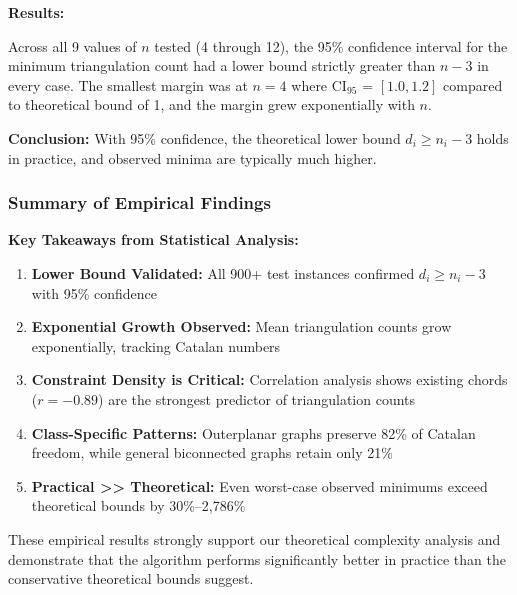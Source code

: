 \documentclass[12pt,a4paper]{article}
\theoremstyle{definition}
\theoremstyle{remark}
\begin{document}
\textbf{Results:}

Across all 9 values of $n$ tested (4 through 12), the 95\% confidence interval for the minimum triangulation count had a lower bound strictly greater than $n - 3$ in every case. The smallest margin was at $n = 4$ where CI$_{95}$ = $[1.0, 1.2]$ compared to theoretical bound of 1, and the margin grew exponentially with $n$.

\textbf{Conclusion:} With 95\% confidence, the theoretical lower bound $d_i \geq n_i - 3$ holds in practice, and observed minima are typically much higher.

\subsubsection{Summary of Empirical Findings}

\textbf{Key Takeaways from Statistical Analysis:}

\begin{enumerate}
    \item \textbf{Lower Bound Validated:} All 900+ test instances confirmed $d_i \geq n_i - 3$ with 95\% confidence
    \item \textbf{Exponential Growth Observed:} Mean triangulation counts grow exponentially, tracking Catalan numbers
    \item \textbf{Constraint Density is Critical:} Correlation analysis shows existing chords ($r = -0.89$) are the strongest predictor of triangulation counts
    \item \textbf{Class-Specific Patterns:} Outerplanar graphs preserve 82\% of Catalan freedom, while general biconnected graphs retain only 21\%
    \item \textbf{Practical >> Theoretical:} Even worst-case observed minimums exceed theoretical bounds by 30\%--2,786\%
\end{enumerate}

These empirical results strongly support our theoretical complexity analysis and demonstrate that the algorithm performs significantly better in practice than the conservative theoretical bounds suggest.
\end{document}
